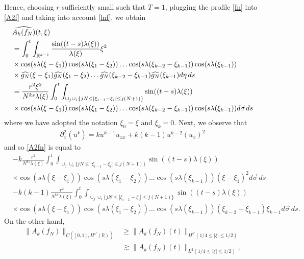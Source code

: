 \documentclass{amsart}
\newcommand{\wh}{\widehat}
\newcommand{\p}{\partial}
\begin{document}
Hence, choosing $r$ sufficiently small such that $T=1$, plugging the profile \eqref{fn} into \eqref{A2f} and taking into account \eqref{lnf}, we obtain
\begin{equation}
\aligned
&\widehat{A_{k}(f_N)}(t,\xi)\\
&=\int_0^t \int_{\mathbb{R}^{k-1}} \frac{\sin((t-s) \lambda(\xi))}{\lambda(\xi)} \xi^2 
\\
& \times \cos(s \lambda(\xi- \xi_{1}))
\cos(s \lambda(\xi_{1}- \xi_{2}))\dots
\cos(s \lambda(\xi_{k-2} - \xi_{k-1}))
\cos(s\lambda(\xi_{k-1}))
\\
& \times \widehat{g_N}(\xi - \xi_{1})\widehat{g_N}(\xi_{1} - \xi_{2})\dots
\wh{g_{N}}(\xi_{k-2} - \xi_{k-1})
\wh{g_{N}}(\xi_{k-1})
d \eta\,ds\\
&=\frac{r^2 \xi^2}{N^{ks}\lambda(\xi)}\int_0^t \int_{\cup_{j} \cup_{i} \{jN \leq |\xi_{i-1}-\xi_{i}|\leq j(N+1)\}}\sin((t-s) \lambda(\xi))
\\
& \times \cos(s \lambda(\xi- \xi_{1}))
\cos(s \lambda(\xi_{1}- \xi_{2}))\dots
\cos(s\lambda(\xi_{k-2} - \xi_{k-1}))
\cos(s\lambda(\xi_{k-1}))d \vec{\sigma}\,ds
\label{A2fn}
\endaligned
\end{equation}
where we have adopted the notation $\xi_{0} = \xi$ and $\xi_{k} = 0$.
Next, we observe that
\begin{equation*}
\begin{split}
\p_{x}^	2(u^{k}) = ku^{k-1}u_{xx} + k(k-1)u^{k-2}(u_{x})^{2}
\end{split}
\end{equation*}
and so \eqref{A2fn} is equal to
\begin{equation}
  \label{fg}
\begin{split}
& -k\frac{r^2}{N^{ks}\lambda(\xi)}\int_0^t 
\int_{\cup_{j} \cup_{i}\{jN \leq |\xi_{i-1}-\xi_{i}|\leq j(N+1)\}}
\sin((t-s) \lambda(\xi))
\\
& \times 
\cos(s \lambda(\xi- \xi_{1}))
\cos(s \lambda(\xi_{1}- \xi_{2}))\dots\cos(s\lambda(\xi_{k-1}))
(\xi - \xi_{1})^{2}
d \vec{\sigma}\,ds
\\
& - k(k-1)
\frac{r^2}{N^{ks}\lambda(\xi)}\int_0^t 
\int_{\cup_{j} \cup_{i}\{jN \leq |\xi_{i-1}-\xi_{i}|\leq j(N+1)\}}
\sin((t-s) \lambda(\xi))
\\
& \times
\cos(s \lambda(\xi- \xi_{1}))
\cos(s \lambda(\xi_{1}- \xi_{2}))\dots\cos(s\lambda(\xi_{k-1}))
(\xi_{k-2} - \xi_{k-1})\xi_{k-1}
d \vec{\sigma}\,ds.
\end{split}
\end{equation}
On the other hand,
\begin{equation}
  \begin{split}
\|A_{k}(f_N)\|_{C([0,1], H^{s'}(\mathbb{R}))} &\geq \|A_{k}(f_N)(t)\|_{H^{s'}(1/4\leq |\xi| \leq 1/2)}\\ &\gtrsim \|A_{k}(f_N)(t)\|_{L^2(1/4\leq |\xi| \leq 1/2)},
  \label{gh}
\end{split}
\end{equation}
\end{document}
